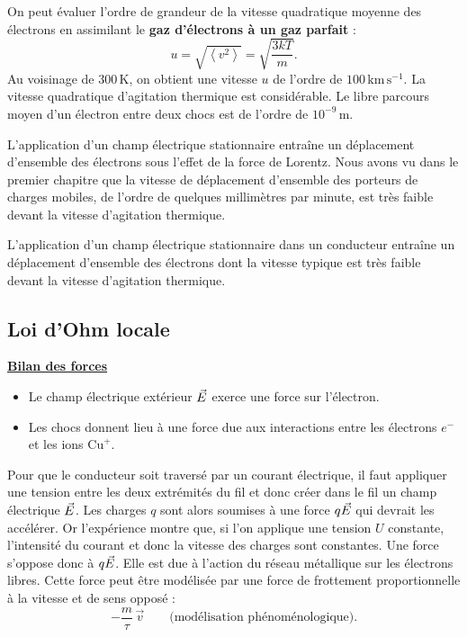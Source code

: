 \documentclass[11pt,a4paper]{article}
\newif\ifinexample
\newcommand{\vv}{\vec v}
\newcommand{\titr}[1]{\par\ifinexample\else\Needspace{4\baselineskip}\fi\textbf{\underline{#1}}\par\nopagebreak[3]}
\newcommand{\av}[1]{\left\langle #1\right\rangle}
\newcommand{\unite}[1]{\,\mathrm{#1}}
\begin{document}
On peut évaluer l'ordre de grandeur
de la vitesse quadratique moyenne des électrons en assimilant le \textbf{gaz d'électrons à un gaz parfait} :\label{verif:vitesse}
\[
 u=\sqrt{\av{v^2}}=\sqrt{\frac{3kT}{m}}.
\]
Au voisinage de \(300\unite K\), on obtient une vitesse \(u\) de l'ordre de \(100\unite{km\,s^{-1}}\).
La vitesse quadratique d'agitation thermique est considérable. Le libre parcours moyen d'un
électron entre deux chocs est de l'ordre de \(10^{-9}\unite m\).

L'application d'un champ électrique stationnaire entraîne un déplacement d'ensemble des électrons
sous l'effet de la force de Lorentz. Nous avons vu dans le premier chapitre que la vitesse de
déplacement d'ensemble des porteurs de charges mobiles, de l'ordre de quelques millimètres par
minute, est très faible devant la vitesse d'agitation thermique.

\begin{cadre}L'application d'un champ électrique stationnaire dans un
conducteur entraîne un déplacement d'ensemble des électrons dont la vitesse typique est
très faible devant la vitesse d'agitation thermique.\end{cadre}

\subsection{Loi d'Ohm locale}\label{sec:ohm}
\titr{Bilan des forces}
\begin{itemize}
\item Le champ électrique extérieur \(\vec E\) exerce une force sur l'électron.
\item Les chocs donnent lieu à une force due aux interactions entre les électrons \(e^-\) et les ions \(\mathrm{Cu}^+\).
\end{itemize}

Pour que le conducteur soit traversé par un courant électrique, il faut appliquer une tension
entre les deux extrémités du fil et donc créer dans le fil un champ électrique \(\vec E\).
Les charges \(q\) sont alors soumises à une force \(q\vec E\) qui devrait les accélérer. Or
l'expérience montre que, si l'on applique une tension \(U\) constante, l'intensité du courant et
donc la vitesse des charges sont constantes. Une force s'oppose donc à \(q\vec E\). Elle est due à
l'action du réseau métallique sur les électrons libres. Cette force peut être modélisée par une
force de frottement proportionnelle à la vitesse et de sens opposé :
\[
 -\frac m\tau\,\vv \qquad \text{(modélisation phénoménologique).}
\]
\end{document}
